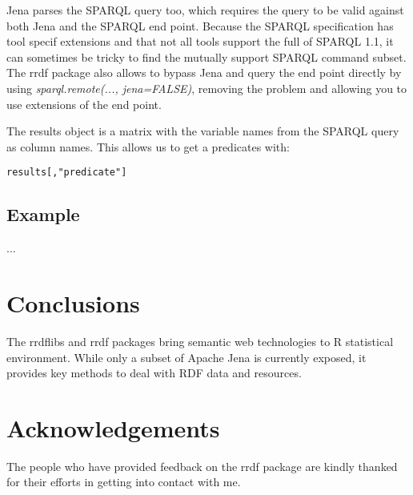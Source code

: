 \documentclass[12pt]{article}
\begin{document}
Jena parses the SPARQL query too, which requires the query to be valid
against both Jena and the SPARQL end point. Because the SPARQL specification has tool specif
extensions and that not all tools support the full of SPARQL 1.1, it can sometimes be tricky
to find the mutually support SPARQL command subset. The rrdf package also allows to bypass
Jena and query the end point directly by using \emph{sparql.remote(..., jena=FALSE)},
removing the problem and allowing you to use extensions of the end point.

The results object is a matrix with the variable names from the SPARQL query as column names.
This allows us to get a predicates with:

\begin{verbatim}
results[,"predicate"]
\end{verbatim}

\subsection{Example}

...

\section{Conclusions}

The rrdflibs and rrdf packages bring semantic web technologies to R statistical environment.
While only a subset of Apache Jena is currently exposed, it provides key methods to deal with
RDF data and resources.

\section{Acknowledgements}

The people who have provided feedback on the rrdf package are kindly thanked for their efforts in
getting into contact with me.

\printbibliography
\end{document}
